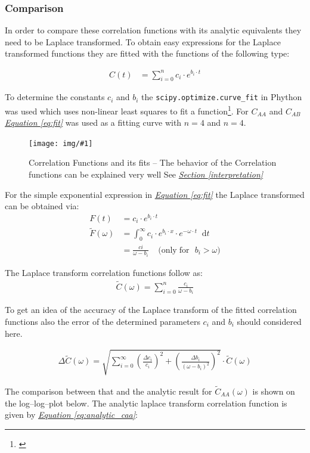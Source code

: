 \documentclass[a4paper, parskip=half]{scrartcl}
\newcommand{\myImage}[2]{
	\begin{figure}[H]
	\centering
	\texttt{[image: img/\#1]}
	\caption{#2}
	\label{pic:#1}
	\end{figure}
}
\newcommand{\diff}{\mathop{}\!\mathrm{d}}
\newcommand{\myEqRef}[1]{\textit{\hyperref[eq:#1]{Equation \ref*{eq:#1}}}}
\newcommand{\mySecRef}[1]{\textit{\hyperref[#1]{Section \ref*{#1}}}}
\newcommand{\myEqLabel}[1]{\label{eq:#1}}
\newcommand{\myCite}[1]{\footnote{\cite{#1} \citeauthor{#1} \citetitle{#1} \citeyear{#1}}}
\begin{document}
\subsubsection{Comparison}
In order to compare these correlation functions with its analytic equivalents they need to be Laplace transformed. To obtain easy expressions for the Laplace transformed functions they are fitted with the functions of the following type:

\begin{align}
C(t) &= \sum_{i=0}^{n} c_i \cdot e^{b_i \cdot t} \myEqLabel{fit}
\end{align}

To determine the constants $c_i$ and $b_i$ the \verb+scipy.optimize.curve_fit+ in Phython was used which uses non-linear least squares to fit a function\myCite{curvefit}. For $C_{AA}$ and $C_{AB}$ \myEqRef{fit} was used as a fitting curve with $n=4$ and $n = 4$.

\myImage{caa_cab}{Correlation Functions and its fits -- The behavior of the Correlation functions can be explained very well See \mySecRef{interpretation}}

For the simple exponential expression in \myEqRef{fit} the Laplace transformed can be obtained via:
\begin{align}
F(t) &= c_i \cdot e^{b_i \cdot t} \\
\widetilde{F}(\omega) &= \int_0^\infty c_i \cdot e^{b_i\cdot x} \cdot e^{-\omega\cdot t}\diff t \\
&= \frac{ci}{\omega - b_i}\;\;\;\; \mathrm{(only\; for\,\,\,\, } b_i > \omega \mathrm{)} \myEqLabel{laplace}
\end{align}

The Laplace transform correlation functions follow as:
\begin{align}
\widetilde{C}(\omega) = \sum_{i=0}^n \frac{c_i}{\omega - b_i}
\end{align}

To get an idea of the accuracy of the Laplace transform of the fitted correlation functions also the error of the determined parameters $c_i$ and $b_i$ should considered here.

\begin{align}
\Delta\widetilde{C}(\omega) = \sqrt{\sum_{i=0}^\infty \left(\frac{\Delta c_i}{c_i} \right)^2 + \left( \frac{\Delta b_i}{(\omega - b_i)^2}\right)^2} \cdot \widetilde{C}(\omega) \myEqLabel{error}
\end{align}

The comparison between that and the analytic result for $\widetilde{C}_{AA}(\omega)$ is shown on the log--log--plot below. The analytic laplace transform correlation function is given by \myEqRef{analytic_caa}:
\end{document}
